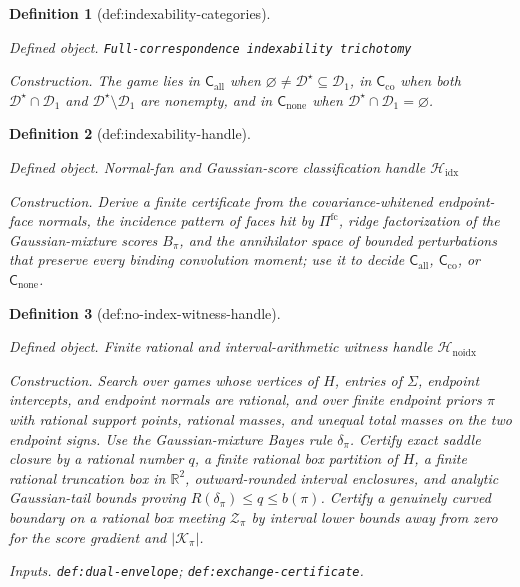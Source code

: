 \documentclass{article}
\newtheorem{definition}{Definition}
\begin{document}
\begin{definition}[def:indexability-categories]\label{def:indexability-categories}
\par\smallskip\noindent\emph{Defined object.} \texttt{Full-\allowbreak{}correspondence indexability trichotomy}
\par\smallskip\noindent\emph{Construction.} The game lies in \(\mathsf C_{\mathrm{all}}\) when \(\varnothing\ne\mathcal D^{\star}\subseteq\mathcal D_1\), in \(\mathsf C_{\mathrm{co}}\) when both \(\mathcal D^{\star}\cap\mathcal D_1\) and \(\mathcal D^{\star}\setminus\mathcal D_1\) are nonempty, and in \(\mathsf C_{\mathrm{none}}\) when \(\mathcal D^{\star}\cap\mathcal D_1=\varnothing\).
\end{definition}

\begin{definition}[def:indexability-handle]\label{def:indexability-handle}
\par\smallskip\noindent\emph{Defined object.} Normal-fan and Gaussian-score classification handle \(\mathscr H_{\mathrm{idx}}\)
\par\smallskip\noindent\emph{Construction.} Derive a finite certificate from the covariance-whitened endpoint-face normals, the incidence pattern of faces hit by \(\Pi^{\mathrm{fc}}\), ridge factorization of the Gaussian-mixture scores \(B_{\pi}\), and the annihilator space of bounded perturbations that preserve every binding convolution moment; use it to decide \(\mathsf C_{\mathrm{all}}\), \(\mathsf C_{\mathrm{co}}\), or \(\mathsf C_{\mathrm{none}}\).
\end{definition}

\begin{definition}[def:no-index-witness-handle]\label{def:no-index-witness-handle}
\par\smallskip\noindent\emph{Defined object.} Finite rational and interval-arithmetic witness handle \(\mathscr H_{\mathrm{noidx}}\)
\par\smallskip\noindent\emph{Construction.} Search over games whose vertices of \(H\), entries of \(\Sigma\), endpoint intercepts, and endpoint normals are rational, and over finite endpoint priors \(\pi\) with rational support points, rational masses, and unequal total masses on the two endpoint signs. Use the Gaussian-mixture Bayes rule \(\delta_{\pi}\). Certify exact saddle closure by a rational number \(q\), a finite rational box partition of \(H\), a finite rational truncation box in \(\mathbb R^2\), outward-rounded interval enclosures, and analytic Gaussian-tail bounds proving \(R(\delta_{\pi})\le q\le b(\pi)\). Certify a genuinely curved boundary on a rational box meeting \(\mathcal Z_{\pi}\) by interval lower bounds away from zero for the score gradient and \( |\mathcal K_{\pi}|\).
\par\smallskip\noindent\emph{Inputs.} \texttt{def:\allowbreak{}dual-\allowbreak{}envelope}; \texttt{def:\allowbreak{}exchange-\allowbreak{}certificate}.
\end{definition}
\end{document}
